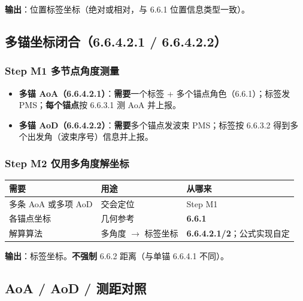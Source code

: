 \documentclass[11pt,a4paper]{ctexart}
\begin{document}
\textbf{输出}：位置标签坐标（绝对或相对，与 6.6.1 位置信息类型一致）。

\subsection{多锚坐标闭合（6.6.4.2.1 / 6.6.4.2.2）}
\label{sec:multi}

\subsubsection{Step M1 多节点角度测量}

\begin{itemize}[nosep]
  \item \textbf{多锚 AoA（6.6.4.2.1）}：\textbf{需要}一个标签 + 多个锚点角色（6.6.1）；标签发 PMS；\textbf{每个锚点}按 6.6.3.1 测 AoA 并上报。
  \item \textbf{多锚 AoD（6.6.4.2.2）}：\textbf{需要}多个锚点发波束 PMS；标签按 6.6.3.2 得到多个出发角（波束序号）信息并上报。
\end{itemize}

\subsubsection{Step M2 仅用多角度解坐标}

\begin{table}[h]
\centering
\small
\begin{tabular}{L{3.2cm}L{5.0cm}L{4.8cm}}
\toprule
\textbf{需要} & \textbf{用途} & \textbf{从哪来} \\
\midrule
多条 AoA 或多项 AoD & 交会定位 & Step M1 \\
各锚点坐标 & 几何参考 & \textbf{6.6.1} \\
解算算法 & 多角度 $\rightarrow$ 标签坐标 & \textbf{6.6.4.2.1/2}；公式实现自定 \\
\bottomrule
\end{tabular}
\end{table}

\textbf{输出}：标签坐标。\textbf{不强制} 6.6.2 距离（与单锚 6.6.4.1 不同）。

\subsection{AoA / AoD / 测距对照}
\end{document}

